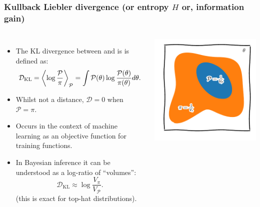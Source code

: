 \documentclass[aspectratio=169]{beamer}
\begin{document}
\begin{frame}
    \frametitle{Kullback Liebler divergence (or entropy $H$ or, information gain)}
    \begin{columns}
        \begin{itemize}
            \item The KL divergence between  and  is is defined as:
                \[\mathcal{D}_\text{KL} = \av[\mathcal{P}]{\log\frac{\mathcal{P}}{\pi}} = \int \mathcal{P}(\theta) \log \frac{\mathcal{P}(\theta)}{\pi(\theta)}d\theta.\]
            \item Whilst not a distance, $\mathcal{D}=0$ when $\mathcal{P}=\pi$.
            \item Occurs in the context of machine learning as an objective function for training functions.
            \item In Bayesian inference it can be understood as a log-ratio of ``volumes'':
                \[ \mathcal{D}_\text{KL} \approx \log \frac{V_\pi}{V_\mathcal{P}}.\]
                (this is exact for top-hat distributions).
        \end{itemize}
        \includegraphics{figures/volumes.pdf}
    \end{columns}
\end{frame}
\end{document}
